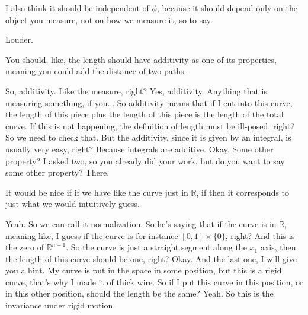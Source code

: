 \begin{student-question}
I also think it should be independent of $\phi$, because it should depend only on the object you measure, not on how we measure it, so to say.
\end{student-question}

\begin{spoken-clean}[10:22 - 10:23]
Louder.
\end{spoken-clean}

\begin{student-question}
You should, like, the length should have additivity as one of its properties, meaning you could add the distance of two paths.
\end{student-question}

\begin{spoken-clean}[10:23 - 11:46]
So, additivity. Like the measure, right? Yes, additivity. Anything that is measuring something, if you... So additivity means that if I cut into this curve, the length of this piece plus the length of this piece is the length of the total curve. If this is not happening, the definition of length must be ill-posed, right? So we need to check that. But the additivity, since it is given by an integral, is usually very easy, right? Because integrals are additive. Okay. Some other property? I asked two, so you already did your work, but do you want to say some other property? There.
\end{spoken-clean}

\begin{student-question}
It would be nice if if we have like the curve just in $\mathbb{R}$, if then it corresponds to just what we would intuitively guess.
\end{student-question}

\begin{spoken-clean}[11:46 - 13:55]
Yeah. So we can call it normalization. So he's saying that if the curve is in $\mathbb{R}$, meaning like, I guess if the curve is for instance $[0,1] \times \{0\}$, right? And this is the zero of $\mathbb{R}^{n-1}$. So the curve is just a straight segment along the $x_1$ axis, then the length of this curve should be one, right? Okay. And the last one, I will give you a hint. My curve is put in the space in some position, but this is a rigid curve, that's why I made it of thick wire. So if I put this curve in this position, or in this other position, should the length be the same? Yeah. So this is the invariance under rigid motion.
\end{spoken-clean}

